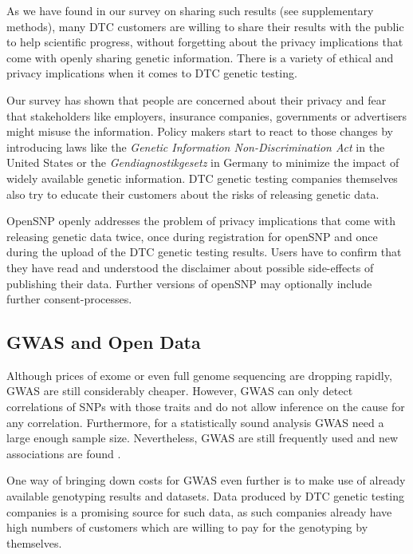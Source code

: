 \documentclass[10pt]{article}
\begin{document}
As we have found in our survey on sharing such results (see supplementary methods), many DTC customers are willing to share their results with the public to help scientific progress, without forgetting about the privacy implications that come with openly sharing genetic information. There is a variety of ethical and privacy implications when it comes to DTC genetic testing\cite{Caulfield2011,Joh2011}. 

Our survey has shown that people are concerned about their privacy and fear that stakeholders like employers, insurance companies, governments 
or advertisers might misuse the information. Policy makers start to react to those changes by introducing laws like the 
\textit{Genetic Information Non-Discrimination Act} in the United States or the \emph{Gendiagnostikgesetz} in Germany to minimize the impact of
widely available genetic information. DTC genetic testing companies themselves also try to educate their customers about the risks of releasing genetic data.  

OpenSNP openly addresses the problem of privacy implications that come with releasing genetic data twice, once during registration for openSNP and once during 
the upload of the DTC genetic testing results. Users have to confirm that they have read and understood the disclaimer about possible side-effects 
of publishing their data. Further versions of openSNP may optionally include further consent-processes.

\subsection*{GWAS and Open Data}
Although prices of exome or even full genome sequencing are dropping rapidly, GWAS are still considerably cheaper. However, GWAS can only detect correlations of SNPs with those traits and do not allow 
inference on the cause for any correlation. Furthermore, for a statistically sound analysis GWAS need a large enough sample size. Nevertheless, GWAS are still frequently used and new associations are found \cite{10.1371.journal.pone.0031470,10.1371.journal.pone.0030309,10.1371.journal.pone.0029848}. 

One way of bringing down costs for GWAS even further is to make use of already available genotyping results and datasets. 
Data produced by DTC genetic testing companies is a promising source for such data, as such companies already have high 
numbers of customers which are willing to pay for the genotyping by themselves.
\end{document}

